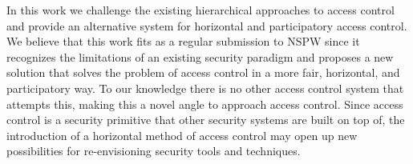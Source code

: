 In this work we challenge the existing hierarchical approaches to access control
and provide an alternative system for horizontal and participatory access
control. We believe that this work fits as a regular submission to NSPW since it
recognizes the limitations of an existing security paradigm and proposes a new
solution that solves the problem of access control in a more fair, horizontal,
and participatory way. To our knowledge there is no other access control system
that attempts this, making this a novel angle to approach access control. Since
access control is a security primitive that other security systems are built on
top of, the introduction of a horizontal method of access control may open up
new possibilities for re-envisioning security tools and techniques.
